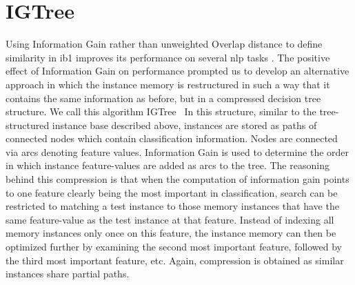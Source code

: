 \documentclass{book}
\begin{document}
\section{IGTree}
\label{igtree}

Using Information Gain rather than unweighted Overlap distance to
define similarity in {\sc ib1} improves its performance on several
{\sc nlp} tasks \cite{Daelemans+92b,VandenBosch+93,VandenBosch97}.
The positive effect of Information Gain on performance prompted us to
develop an alternative approach in which the instance memory is
restructured in such a way that it contains the same information as
before, but in a compressed decision tree structure. We call this
algorithm {\sc IGTree}~\cite{Daelemans+97} 
In this structure, similar to the
tree-structured instance base described above, instances are stored as
paths of connected nodes which contain classification
information. Nodes are connected via arcs denoting feature
values. Information Gain is used to determine the order in which
instance feature-values are added as arcs to the tree. The reasoning
behind this compression is that when the computation of information
gain points to one feature clearly being the most important in
classification, search can be restricted to matching a test instance
to those memory instances that have the same feature-value as the test
instance at that feature. Instead of indexing all memory instances
only once on this feature, the instance memory can then be optimized
further by examining the second most important feature, followed by
the third most important feature, etc.  Again, compression is obtained
as similar instances share partial paths.

\end{document}
